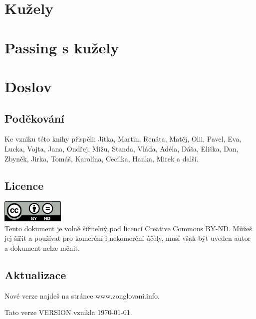 \documentclass[12pt,a4paper,twoside]{book}
\begin{document}


\chapter{Kužely}



\chapter{Passing s kužely}



\chapter{Doslov}
\section{Poděkování}
Ke vzniku této knihy přispěli: Jitka, Martin, Renáta, Matěj, Olii, Pavel, Eva, Lucka, Vojta, Jana, Ondřej, Mižu, Standa, Vláďa, Adéla, Dáša, Eliška, Dan, Zbyněk, Jirka, Tomáš, Karolína, Cecilka, Hanka, Mirek a další.
\section{Licence}
\includegraphics[width=3cm]{obrazky/cc-by-nd.png}\\
Tento dokument je volně šiřitelný pod licencí Creative Commons BY-ND.
Můžeš jej šířit a používat pro komerční i nekomerční účely, musí však být uveden autor a dokument nelze měnit.
\section{Aktualizace}
Nové verze najdeš na stránce www.zonglovani.info.

Tato verze VERSION vznikla \today.
\end{document}

